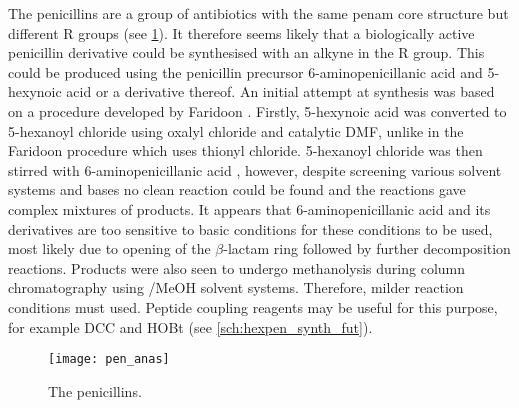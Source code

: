 The penicillins are a group of antibiotics with the same penam core structure but different R groups (see \ref{fgr:pen_anas}). It therefore seems likely that a biologically active penicillin derivative could be synthesised with an alkyne in the R group. This could be produced using the penicillin precursor 6-aminopenicillanic acid  and 5-hexynoic acid  or a derivative thereof. 
An initial attempt at synthesis was based on a procedure developed by Faridoon \cite{Faridoon2012}. Firstly, 5-hexynoic acid  was converted to 5-hexanoyl chloride  using oxalyl chloride and catalytic DMF, unlike in the Faridoon procedure which uses thionyl chloride. 5-hexanoyl chloride  was then stirred with 6-aminopenicillanic acid , however, despite screening various solvent systems and bases no clean reaction could be found and the reactions gave complex mixtures of products. It appears that 6-aminopenicillanic acid  and its derivatives are too sensitive to basic conditions for these conditions to be used, most likely due to opening of the $\beta$-lactam ring followed by further decomposition reactions. Products were also seen to undergo methanolysis  during  column chromatography using /MeOH solvent systems. Therefore, milder reaction conditions must used. Peptide coupling reagents may be useful for this purpose, for example DCC and HOBt (see \ref{sch:hexpen_synth_fut}).


\begin{figure}[H]
	\begin{center}
		\texttt{[image: pen\_anas]}
		\caption{The penicillins.\label{fgr:pen_anas}} 
	\end{center}
\end{figure}


